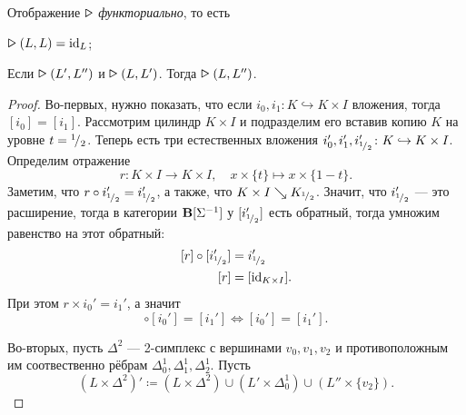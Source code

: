 \documentclass[10pt, twoside]{article}
\begin{document}
\begin{lemma}
    Отображение $\bigtriangleright$ \emph{функториально}, то есть 
    \begin{conditions}
        \item $\bigtriangleright(L, L) = \id_L$;
        \item Если $\bigtriangleright(L', L'')$ и $\bigtriangleright(L, L')$. Тогда $\bigtriangleright(L, L'')$.
    \end{conditions}
\end{lemma}
\begin{proof}
    Во-первых, нужно показать, что если $i_0, i_1 \colon K \hookrightarrow K \times I$ вложения, тогда $[i_0] = [i_1]$. Рассмотрим цилиндр $K \times I$ и подразделим его вставив копию $K$ на уровне $t = {}^{1}\!/_{2}$. Теперь есть три естественных вложения $i_0', i_1', i_{{}^{1}\!/_{2}}' \colon K \hookrightarrow K \times I$. Определим отражение $$r \colon K \times I \to K \times I, \quad x \times \{t\} \mapsto x \times \{1-t\}.$$ 
    Заметим, что $r \circ i_{{}^{1}\!/_{2}}' = i_{{}^{1}\!/_{2} }'$, а также, что $K \times I \searrow K_{{}^{1}\!/_{2}}$. Значит, что $i_{{}^{1}\!/_{2}}'$ --- это расширение, тогда в категории $\mathbf{B}[\Sigma^{-1}]$ у $[i_{{}^{1}\!/_{2}}']$ есть обратный, тогда умножим равенство на этот обратный:
    \begin{equation}
        \begin{aligned}
            [r] \circ [i_{\rfrac 1 2}'] &= i_{\rfrac 1 2}' \\
            [r] &= [\id_{K\times I}].
        \end{aligned}
    \end{equation}
    При этом $r \times i_0' = i_1'$, а значит 
    \begin{equation}
        [r] \circ [i_0'] = [i_1'] \Longleftrightarrow [i_0'] = [i_1'].
    \end{equation}
    
    Во-вторых, пусть $\Delta^2$ --- 2-симплекс с вершинами $v_0, v_1, v_2$ и противоположным им соотвественно рёбрам $\Delta_0^1, \Delta_1^1, \Delta_2^1.$ Пусть $$(L \times \Delta^2)' \coloneq (L \times \Delta^2) \cup (L' \times \Delta_0^1) \cup (L'' \times \{v_2\}). $$

\end{proof}
\end{document}
